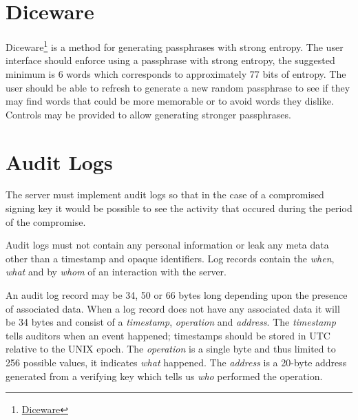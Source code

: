 \documentclass[a4paper,titlepage,oneside]{article}
\renewcommand{\paragraph}{\small}
\begin{document}
\section{Diceware}

\paragraph{Diceware\footnote{\href{https://en.wikipedia.org/wiki/Diceware}{Diceware}} is a method for generating passphrases with strong entropy. The user interface should enforce using a passphrase with strong entropy, the suggested minimum is 6 words which corresponds to approximately 77 bits of entropy. The user should be able to refresh to generate a new random passphrase to see if they may find words that could be more memorable or to avoid words they dislike. Controls may be provided to allow generating stronger passphrases.}

\section{Audit Logs}

\paragraph{The server must implement audit logs so that in the case of a compromised signing key it would be possible to see the activity that occured during the period of the compromise.}

\paragraph{Audit logs must not contain any personal information or leak any meta data other than a timestamp and opaque identifiers. Log records contain the \emph{when}, \emph{what} and by \emph{whom} of an interaction with the server.}

\paragraph{An audit log record may be 34, 50 or 66 bytes long depending upon the presence of associated data. When a log record does not have any associated data it will be 34 bytes and consist of a \emph{timestamp}, \emph{operation} and \emph{address}. The \emph{timestamp} tells auditors when an event happened; timestamps should be stored in UTC relative to the UNIX epoch. The \emph{operation} is a single byte and thus limited to 256 possible values, it indicates \emph{what} happened. The \emph{address} is a 20-byte address generated from a verifying key which tells us \emph{who} performed the operation.}
\end{document}
